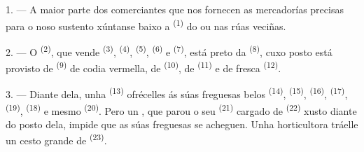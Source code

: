 %
%

\VUsaut{4.0mm}
\VUsaut{3.0mm}

\VUsaut{3.0mm}

1. --- A maior parte dos comerciantes que nos fornecen as mercadorías precisas para o
noso sustento xúntanse baixo a  \textsuperscript{(1)} do
 ou nas rúas veciñas.

2. --- O  \textsuperscript{(2)}, que vende 
\textsuperscript{(3)},  \textsuperscript{(4)}, 
\textsuperscript{(5)},  \textsuperscript{(6)} e 
\textsuperscript{(7)}, está preto da 
\textsuperscript{(8)}, cuxo posto está provisto de 
\textsuperscript{(9)} de codia vermella, de 
\textsuperscript{(10)}, de  \textsuperscript{(11)} e de
 fresca \textsuperscript{(12)}.

3. --- Diante dela, unha  \textsuperscript{(13)}
ofrécelles ás súas freguesas belos  \textsuperscript{(14)},
 \textsuperscript{(15)}, 
\textsuperscript{(16)},  \textsuperscript{(17)},
 \textsuperscript{(19)},  \textsuperscript{(18)} e
mesmo  \textsuperscript{(20)}. Pero un , que parou o seu  \textsuperscript{(21)}
cargado de  \textsuperscript{(22)} xusto diante do posto
dela, impide que as súas freguesas se acheguen. Unha horticultora tráelle un cesto
grande de  \textsuperscript{(23)}.

